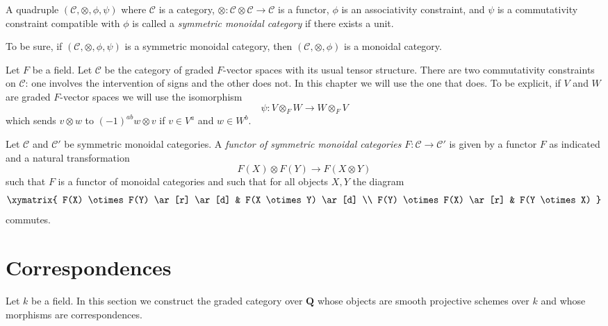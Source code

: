 \begin{definition}
\label{definition-symmetric-monoidal-category}
A quadruple $(\mathcal{C}, \otimes, \phi, \psi)$ where
$\mathcal{C}$ is a category,
$\otimes : \mathcal{C} \otimes \mathcal{C} \to \mathcal{C}$ is a functor,
$\phi$ is an associativity constraint, and
$\psi$ is a commutativity constraint compatible with $\phi$
is called a {\it symmetric monoidal category} if there exists
a unit.
\end{definition}

\noindent
To be sure, if $(\mathcal{C}, \otimes, \phi, \psi)$ is a
symmetric monoidal category, then $(\mathcal{C}, \otimes, \phi)$
is a monoidal category.

\begin{example}
\label{example-graded-vector-spaces}
Let $F$ be a field. Let $\mathcal{C}$ be the category of graded
$F$-vector spaces with its usual tensor structure. There are
two commutativity constraints on $\mathcal{C}$: one involves the
intervention of signs and the other does not. In this chapter we will
use the one that does. To be explicit, if $V$ and $W$ are graded $F$-vector
spaces we will use the isomorphism
$$
\psi : V \otimes_F W \longrightarrow W \otimes_F V
$$
which sends $v \otimes w$ to $(-1)^{ab}w \otimes v$ if
$v \in V^a$ and $w \in W^b$.
\end{example}

\begin{definition}
\label{definition-functor-symmetric-monoidal-categories}
Let $\mathcal{C}$ and $\mathcal{C}'$ be symmetric monoidal categories.
A {\it functor of symmetric monoidal categories}
$F : \mathcal{C} \to \mathcal{C}'$
is given by a functor $F$ as indicated and a natural transformation
$$
F(X) \otimes F(Y) \to F(X \otimes Y)
$$
such that $F$ is a functor of monoidal categories and such that
for all objects $X, Y$ the diagram
$$
\xymatrix{
F(X) \otimes F(Y) \ar[r] \ar[d] &
F(X \otimes Y) \ar[d] \\
F(Y) \otimes F(X) \ar[r] &
F(Y \otimes X)
}
$$
commutes.
\end{definition}








\section{Correspondences}
\label{section-correspondences}

\noindent
Let $k$ be a field. In this section we construct the graded category over
$\mathbf{Q}$ whose objects are smooth projective schemes over $k$ and whose
morphisms are correspondences.

